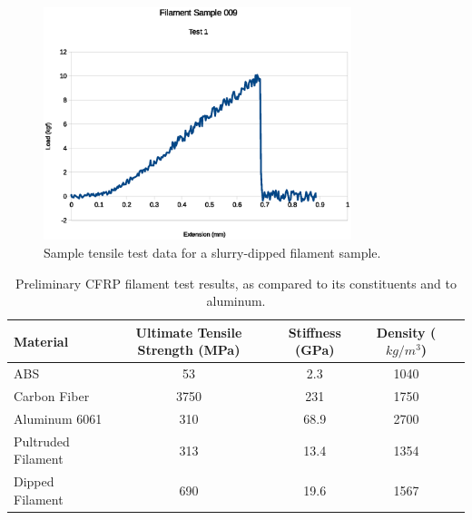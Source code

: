 \begin{figure}[htp]
    \centering
    \includegraphics[width=0.8\textwidth]{./figures/009T1-instron-data}
    \caption{Sample tensile test data for a slurry-dipped filament sample.}
    \label{fig:instron-sample}
\end{figure}

\begin{table}[h]
    \centering
    \begin{tabular}{lcccc}
        Material           & Ultimate Tensile Strength (MPa)   & Stiffness (GPa)    & Density ($ kg/m^{3} $)  \\ \hline
        ABS                & 53                                & 2.3                & 1040 \\
        Carbon Fiber       & 3750                              & 231                & 1750 \\
        Aluminum 6061      & 310                               & 68.9               & 2700 \\
        Pultruded Filament & 313                               & 13.4               & 1354 \\ 
        Dipped Filament    & 690                               & 19.6               & 1567 \\
    \end{tabular}
    \caption{Preliminary CFRP filament test results, as compared to its constituents and to aluminum.}
    \label{tab:test-results}
\end{table}
